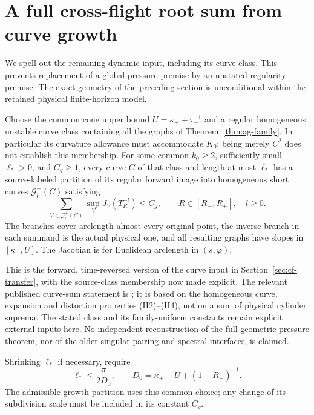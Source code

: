 \section{A full cross-flight root sum from curve growth}
\label{sec:ag-growth}
We spell out the remaining dynamic input, including its curve class.
This prevents replacement of a global pressure premise by an unstated
regularity premise. The exact geometry of the preceding section is
unconditional within the retained physical finite-horizon model.

\begin{inputstatement}
\label{input:ag-growth}
Choose the common cone upper bound
$U=\kappa_++\tau_-^{-1}$ and a regular homogeneous unstable
curve class containing all the graphs of
Theorem~\ref{thm:ag-family}. In particular its curvature allowance
must accommodate $K_0$; being merely $C^2$ does not establish this
membership. For some common $k_0\ge2$, sufficiently small
$\ell_*>0$, and $C_g\ge1$, every curve $C$ of that class and
length at most $\ell_*$ has a source-labeled partition of its
regular forward image into homogeneous short curves
$\mathcal G^+_l(C)$ satisfying
\begin{equation}\label{eq:ag-growth}
 \sum_{V\in\mathcal G^+_l(C)}
       \sup_V J_V(T_R^{-l})\le C_g,
             \qquad R\in[R_-,R_+],\quad l\ge0.
\end{equation}
The branches cover arclength-almost every original point, the
inverse branch in each summand is the actual physical one, and
all resulting graphs have slopes in $[\kappa_-,U]$.
The Jacobian is for Euclidean arclength in $(s,\varphi)$.
\end{inputstatement}

This is the forward, time-reversed version of the curve input in
Section~\ref{sec:cf-transfer}, with the source-class membership
now made explicit. The relevant published curve-sum statement is
\cite[Lemma 3.2(b)]{DZUniform}; it is based on the homogeneous curve,
expansion and distortion properties (H2)--(H4), not on a sum of
physical cylinder suprema. The stated class and its family-uniform
constants remain explicit external inputs here. No independent
reconstruction of the full geometric-pressure theorem, nor of the
older singular pairing and spectral interfaces, is claimed.

Shrinking $\ell_*$ if necessary, require
\begin{equation}\label{eq:ag-length-choice}
 \ell_*\le\frac{\pi}{2D_0},\qquad
 D_0=\kappa_++U+(1-R_+)^{-1}.
\end{equation}
The admissible growth partition uses this common choice; any change
of its subdivision scale must be included in its constant $C_g$.

